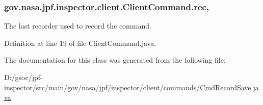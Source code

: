 \subsubsection[{\texorpdfstring{rec}{rec}}]{ gov.\+nasa.\+jpf.\+inspector.\+client.\+Client\+Command.\+rec\hspace{0.3cm}{\ttfamily [protected]}, {\ttfamily [inherited]}}\hypertarget{classgov_1_1nasa_1_1jpf_1_1inspector_1_1client_1_1_client_command_af4246f2427035c72a6af45a2c61361f7}{}\label{classgov_1_1nasa_1_1jpf_1_1inspector_1_1client_1_1_client_command_af4246f2427035c72a6af45a2c61361f7}


The last recorder used to record the command. 



Definition at line 19 of file Client\+Command.\+java.



The documentation for this class was generated from the following file\+:\begin{DoxyCompactItemize}
\item 
D\+:/gsoc/jpf-\/inspector/src/main/gov/nasa/jpf/inspector/client/commands/\hyperlink{_cmd_record_save_8java}{Cmd\+Record\+Save.\+java}\end{DoxyCompactItemize}
